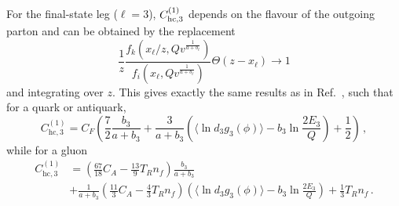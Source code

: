   For the final-state leg ($\ell=3$), $C^{(1)}_{{\rm hc},3}$ depends
  on the flavour of the outgoing parton and can be obtained by
  the replacement
  \begin{equation}
    \label{eq:C-recovery}
    \frac{1}{z}\frac{f_k(x_\ell/z,Qv^{\frac{1}{a+b_\ell}})}{f_i(x_\ell,Qv^{\frac{1}{a+b_\ell}})}\Theta(z-x_\ell)\to 1
  \end{equation}
  and integrating over $z$. This gives exactly
  the same results as in Ref.~\cite{Arpino:2019ozn},
  such that for a quark or antiquark,
  \begin{equation}
    \label{eq:C1hc-q}
    C_{\mathrm{hc},3}^{(1)}=C_F\left(\frac{7}{2}\frac{b_3}{a+b_3}+\frac{3}{a+b_3}\left(\langle \ln d_3 g_3(\phi)\rangle-b_3\ln\frac{2E_3}{Q}\right)+\frac 12\right)\,,
  \end{equation}
  while for a gluon
  \begin{equation}
    \label{eq:C1hc-g}
    \begin{split}
    C_{\mathrm{hc},3}^{(1)}& =\left(\frac{67}{18}C_A-\frac{13}{9}T_R n_f\right)\frac{b_3}{a+b_3}\\ & +\frac{1}{a+b_3}\left(\frac{11}{3}C_A-\frac{4}{3}T_R n_f\right)\left(\langle \ln d_3 g_3(\phi)\rangle-b_3\ln\frac{2E_3}{Q}\right)+\frac{1}{3}T_R n_f\,.
    \end{split}
  \end{equation}

